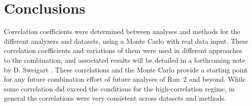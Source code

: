 
\graphicspath{{Body/Figures/}}

\clearpage
\section{Conclusions}


Correlation coefficients were determined between analyses and methods for the different \Rone \wa analyzers and datasets, using a Monte Carlo with real data input. These correlation coefficients and variations of them were used in different approaches to the \wa combination, and associated results will be detailed in a forthcoming note by D. Sweigart \cite{CombinationMeeting}. These correlations and the Monte Carlo provide a starting point for any future combination effort of future analyses of Run~2 and beyond. While some correlation did exceed the conditions for the high-correlation regime, in general the correlations were very consistent across datasets and methods.

